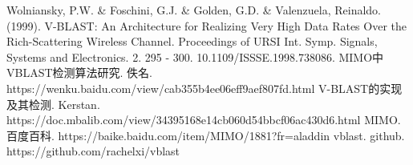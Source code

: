 \begin{thebibliography}{1}
 Wolniansky, P.W. \& Foschini, G.J. \& Golden, G.D. \& Valenzuela, Reinaldo. (1999). V-BLAST: An Architecture for Realizing Very High Data Rates Over the Rich-Scattering Wireless Channel. Proceedings of URSI Int. Symp. Signals, Systems and Electronics. 2. 295 - 300. 10.1109/ISSSE.1998.738086.
 MIMO中VBLAST检测算法研究. 佚名. https://wenku.baidu.com/view/cab355b4ee06eff9aef807fd.html
 V-BLAST的实现及其检测. Kerstan. https://doc.mbalib.com/view/34395168e14cb060d54bbcf06ac430d6.html
 MIMO. 百度百科. https://baike.baidu.com/item/MIMO/1881?fr=aladdin
 vblast. github. https://github.com/rachelxi/vblast
\end{thebibliography}